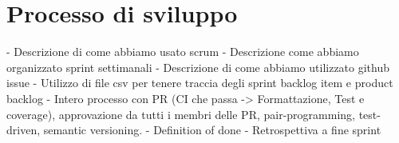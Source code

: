 \chapter{Processo di sviluppo}\label{ch:processo-di-sviluppo}
- Descrizione di come abbiamo usato scrum
- Descrizione come abbiamo organizzato sprint settimanali
- Descrizione di come abbiamo utilizzato github issue
- Utilizzo di file csv per tenere traccia degli sprint backlog item e product backlog
- Intero processo con PR (CI che passa -> Formattazione, Test e coverage), approvazione da tutti i membri delle PR, pair-programming, test-driven, semantic versioning.
- Definition of done
- Retrospettiva a fine sprint